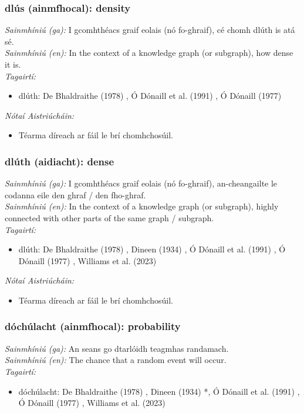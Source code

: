 \subsubsection*{dlús (ainmfhocal): density}
 \noindent \textit{Sainmhíniú (ga):} I gcomhthéacs graif eolais (nó fo-ghraif), cé chomh dlúth is atá sé.
\\
 \noindent \textit{Sainmhíniú (en):} In the context of a knowledge graph (or subgraph), how dense it is.
\\
 \noindent \textit{Tagairtí:}
\begin{itemize}
	\item dlúth: De Bhaldraithe (1978) \cite{de-bhaldraithe}, Ó Dónaill et al. (1991) \cite{focloir-beag}, Ó Dónaill (1977) \cite{odonaill}
\end{itemize}

 \noindent \textit{Nótaí Aistriúcháin:}
\begin{itemize}
	\item Téarma díreach ar fáil le brí chomhchosúil.
\end{itemize}


\subsubsection*{dlúth (aidiacht): dense}
 \noindent \textit{Sainmhíniú (ga):} I gcomhthéacs graif eolais (nó fo-ghraif), an-cheangailte le codanna eile den ghraf / den fho-ghraf.
\\
 \noindent \textit{Sainmhíniú (en):} In the context of a knowledge graph (or subgraph), highly connected with other parts of the same graph / subgraph.
\\
 \noindent \textit{Tagairtí:}
\begin{itemize}
	\item dlúth: De Bhaldraithe (1978) \cite{de-bhaldraithe}, Dineen (1934) \cite{dineen}, Ó Dónaill et al. (1991) \cite{focloir-beag}, Ó Dónaill (1977) \cite{odonaill}, Williams et al. (2023) \cite{storchiste}
\end{itemize}

 \noindent \textit{Nótaí Aistriúcháin:}
\begin{itemize}
	\item Téarma díreach ar fáil le brí chomhchosúil.
\end{itemize}


\subsubsection*{dóchúlacht (ainmfhocal): probability}
 \noindent \textit{Sainmhíniú (ga):} An seans go dtarlóidh teagmhas randamach.
\\
 \noindent \textit{Sainmhíniú (en):} The chance that a random event will occur.
\\
 \noindent \textit{Tagairtí:}
\begin{itemize}
	\item dóchúlacht: De Bhaldraithe (1978) \cite{de-bhaldraithe}, Dineen (1934) \cite{dineen}*, Ó Dónaill et al. (1991) \cite{focloir-beag}, Ó Dónaill (1977) \cite{odonaill}, Williams et al. (2023) \cite{storchiste}
\end{itemize}

